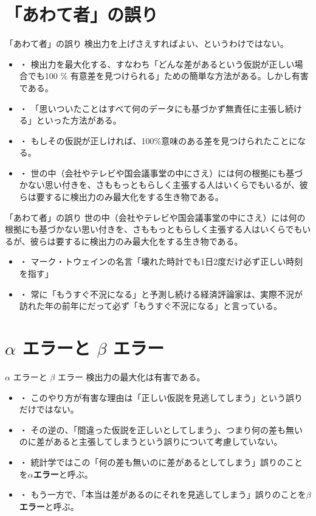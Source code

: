 \documentclass[dvipdfmx, autodetect-engine, aspectratio=169, 10.5pt]{beamer}
\begin{document}
\section{「あわて者」の誤り}

\begin{frame}{「あわて者」の誤り}
	検出力を上げさえすればよい、というわけではない。
	\begin{itemize}
		\item ・ 検出力を最大化する、すなわち「どんな差があるという仮説が正しい場合でも100 $\%$ 有意差を見つけられる」ための簡単な方法がある。しかし有害である。
		\item ・ 「思いついたことはすべて何のデータにも基づかず無責任に主張し続ける」といった方法がある。
		\item ・ もしその仮説が正しければ、100$\%$意味のある差を見つけられたことになる。
		\item ・ 世の中（会社やテレビや国会議事堂の中にさえ）には何の根拠にも基づかない思い付きを、さももっともらしく主張する人はいくらでもいるが、彼らは要するに検出力のみ最大化をする生き物である。
	\end{itemize}
\end{frame}

\begin{frame}{「あわて者」の誤り}
	世の中（会社やテレビや国会議事堂の中にさえ）には何の根拠にも基づかない思い付きを、さももっともらしく主張する人はいくらでもいるが、彼らは要するに検出力のみ最大化をする生き物である。
	\begin{itemize}
		\item ・ マーク・トウェインの名言「壊れた時計でも1日2度だけ必ず正しい時刻を指す」
		      \vspace{5mm}
		\item ・ 常に「もうすぐ不況になる」と予測し続ける経済評論家は、実際不況が訪れた年の前年にだって必ず「もうすぐ不況になる」と言っている。
	\end{itemize}
\end{frame}

\section{$\alpha$ エラーと $\beta$ エラー}

\begin{frame}{$\alpha$ エラーと $\beta$ エラー}
	検出力の最大化は有害である。
	\begin{itemize}
		\item ・ このやり方が有害な理由は「正しい仮説を見逃してしまう」という誤りだけではない。
		\item ・ その逆の、「間違った仮説を正しいとしてしまう」、つまり何の差も無いのに差があると主張してしまうという誤りについて考慮していない。
		      \vspace{5mm}
		\item ・ 統計学ではこの「何の差も無いのに差があるとしてしまう」誤りのことを\textbf{$\alpha$エラー}と呼ぶ。
		      \vspace{5mm}
		\item ・ もう一方で、「本当は差があるのにそれを見逃してしまう」誤りのことを\textbf{$\beta$エラー}と呼ぶ。
	\end{itemize}
\end{frame}
\end{document}
